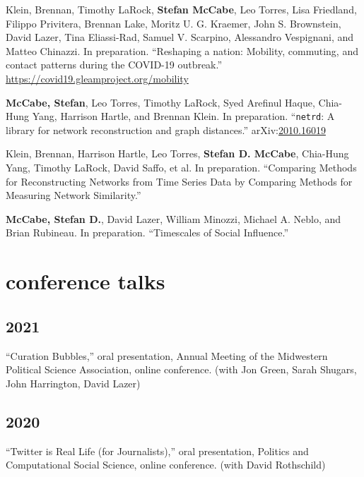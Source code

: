 \documentclass[11pt, letter]{article}
\begin{document}
Klein, Brennan,\textsuperscript{\textdagger}  Timothy LaRock,\textsuperscript{\textdagger}  \textbf{Stefan McCabe},\textsuperscript{\textdagger}  Leo Torres,\textsuperscript{\textdagger}  Lisa Friedland, Filippo Privitera, Brennan Lake, Moritz U. G. Kraemer, John S. Brownstein, David Lazer, Tina Eliassi-Rad, Samuel V. Scarpino, Alessandro Vespignani, and Matteo Chinazzi. In preparation. ``Reshaping a nation: Mobility, commuting, and contact patterns during the COVID-19 outbreak.'' \href{https://covid19.gleamproject.org/mobility}{https://covid19.gleamproject.org/mobility} \vspace{2mm}

\textbf{McCabe, Stefan}, Leo Torres, Timothy LaRock, Syed Arefinul Haque, Chia-Hung Yang, Harrison Hartle, and Brennan Klein. In preparation. ``\texttt{netrd}: A library for network reconstruction and graph distances.'' arXiv:\href{https://arxiv.org/abs/2010.16019}{2010.16019}\vspace{2mm}

Klein, Brennan, Harrison Hartle, Leo Torres, \textbf{Stefan D. McCabe}, Chia-Hung Yang, Timothy LaRock, David Saffo, et al. In preparation. ``Comparing Methods for Reconstructing Networks from Time Series Data by Comparing Methods for Measuring Network Similarity.''\vspace{2mm}

\textbf{McCabe, Stefan D.}, David Lazer, William Minozzi, Michael A. Neblo, and Brian Rubineau. In preparation. ``Timescales of Social Influence.''\vspace{2mm}

\vspace{2mm}
\section{conference talks}

\subsection{2021}

``Curation Bubbles,'' oral presentation, Annual Meeting of the Midwestern Political Science Association, online conference. (with Jon Green, Sarah Shugars, John Harrington, David Lazer)

\subsection{2020}

``Twitter is Real Life (for Journalists),'' oral presentation, Politics and Computational Social Science, online conference. (with David Rothschild)\vspace{2mm}
\end{document}
